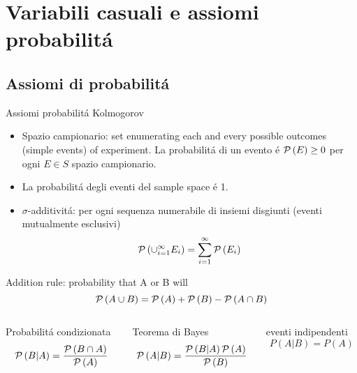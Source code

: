 \section{Variabili casuali e assiomi probabilit\'a}

\subsection{Assiomi di probabilit\'a}

\begin{frame}{Assiomi probabilit\'a Kolmogorov}
\begin{itemize}
\item Spazio campionario: set enumerating each and every possible outcomes (simple events) of experiment. La probabilit\'a di un evento \'e $\operatorname{\mathcal{P}}{(E)}\geq0$ per ogni $E\in S$ spazio campionario.
\item La probabilit\'a degli eventi del sample space \'e 1.
\item $\sigma$-additivit\'a: per ogni sequenza numerabile di insiemi disgiunti (eventi mutualmente esclusivi)
\begin{equation*}
\operatorname{\mathcal{P}}{(\cup_{i=1}^{\infty}E_i)}=\sum_{i=1}^{\infty}\operatorname{\mathcal{P}}{(E_i)}
\end{equation*}
\end{itemize}
\begin{block}{Addition rule: probability that A or B will}
\begin{equation*}
\operatorname{\mathcal{P}}{(A\cup B)}=\operatorname{\mathcal{P}}{(A)}+\operatorname{\mathcal{P}}{(B)}-\operatorname{\mathcal{P}}{(A\cap B)}
\end{equation*}
\end{block}
\begin{columns}[T]
\begin{column}{0.3\textwidth}
\begin{block}{Probabilit\'a condizionata}
\[\operatorname{\mathcal{P}}{(B|A)}=\frac{\operatorname{\mathcal{P}}{(B\cap A)}}{\operatorname{\mathcal{P}}{(A)}}
\]
\end{block}
\end{column}
\begin{column}{0.4\textwidth}
\begin{block}{Teorema di Bayes}
\[\operatorname{\mathcal{P}}{(A|B)}=\frac{\operatorname{\mathcal{P}}{(B|A)}\operatorname{\mathcal{P}}{(A)}}{\operatorname{\mathcal{P}}{(B)}}\]
\end{block}
\end{column}
\begin{column}{0.25\textwidth}
\begin{block}{eventi indipendenti}
    \[P(A|B)=P(A)\]
    \end{block}
    \end{column}
\end{columns}
\end{frame}

